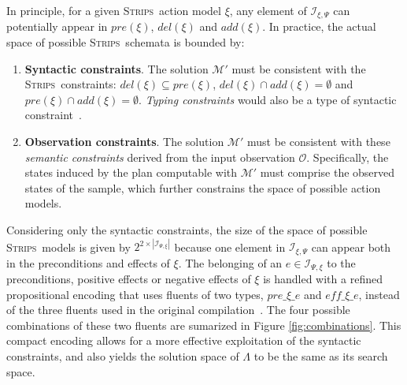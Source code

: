 \documentclass[runningheads]{llncs}
\newcommand{\strips}{\textsc{Strips}}     %
\begin{document}
In principle, for a given \strips\ action model $\xi$, any element of ${\mathcal I}_{\xi,\Psi}$ can potentially appear in $pre(\xi)$, $del(\xi)$ and $add(\xi)$. In practice, the actual space of possible \strips\ schemata is bounded by:
\begin{enumerate}
\item {\bf Syntactic constraints}. The solution $\mathcal{M}'$ must be consistent with the \strips\ constraints: $del(\xi)\subseteq pre(\xi)$, $del(\xi)\cap add(\xi)=\emptyset$ and $pre(\xi)\cap add(\xi)=\emptyset$. {\em Typing constraints} would also be a type of syntactic constraint~\cite{mcdermott1998pddl}.
\item {\bf Observation constraints}. The solution $\mathcal{M}'$ must be consistent with these \emph{semantic constraints} derived from the input observation $\mathcal{O}$. Specifically, the states induced by the plan computable with $\mathcal{M}'$ must comprise the observed states of the sample, which further constrains the space of possible action models.
\end{enumerate}

Considering only the syntactic constraints, the size of the space of possible \strips\ models is given by $2^{2\times|{\mathcal I}_{\Psi,\xi}|}$ because one element in $\mathcal{I}_{\xi,\Psi}$ can appear both in the preconditions and effects of $\xi$. The belonging of an $e \in \mathcal{I}_{\Psi,\xi}$ to the preconditions, positive effects or negative effects of $\xi$ is handled with a refined propositional encoding that uses fluents of two types, $pre\_\xi\_e$ and $eff\_\xi\_e$, instead of the three fluents used in the original compilation~\cite{aineto2018learning}. The four possible combinations of these two fluents are sumarized in Figure \ref{fig:combinations}. This compact encoding allows for a more effective exploitation of the syntactic constraints, and also yields the solution space of $\Lambda$ to be the same as its search space.
\end{document}
